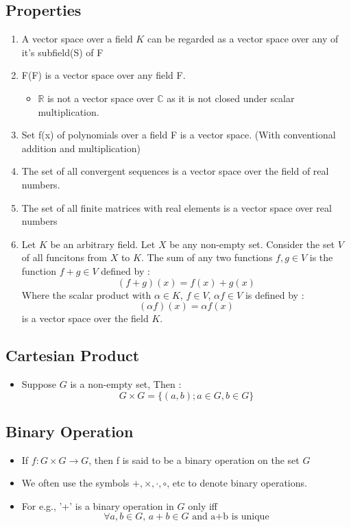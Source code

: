 \documentclass[twoside]{article}
\begin{document}
	\subsection{Properties}
	\begin{enumerate}
		\item A vector space over a field $K$ can be regarded as a vector space over any of it's subfield(S) of F
		\item F(F) is a vector space over any field F.
			\begin{itemize}
				\item $\mathbb{R}$ is not a vector space over $\mathbb{C}$ as it is not closed under scalar multiplication.
			\end{itemize}
		\item Set f(x) of polynomials over a field F is a vector space. (With conventional addition and multiplication)
		\item The set of all convergent sequences is a vector space over the field of real numbers.
		\item The set of all finite matrices with real elements is a vector space over real numbers
		\item Let $K$ be an arbitrary field. Let $X$ be any non-empty set. Consider the set $V$ of all funcitons from $X$ to $K$. The sum of any two functions $f,g \in V$ is the function $f + g \in V$ defined by : 
		\[(f+g)(x) = f(x) + g(x)\]
		Where the scalar product with $\alpha \in K$, $f \in V$, $\alpha f \in V$ is defined by :
		\[(\alpha f)(x) = \alpha f(x)\]
		is a vector space over the field $K$.
	\end{enumerate}
	
	\newpage
	
	\subsection{Cartesian Product}
	\begin{itemize}
		\item Suppose $G$ is a non-empty set, Then :
		\[G \times G = \{(a,b); a \in G, b \in G\}\]
	\end{itemize}
	
	\subsection{Binary Operation}
	\begin{itemize}
		\item If $f : G \times G \rightarrow G$, then f is said to be a binary operation on the set $G$
		\item We often use the symbols $+, \times, \cdot, \circ$, etc to denote binary operations.
		\item For e.g., '+' is a binary operation in $G$ only iff 
		\[\forall a,b \in G\text{, } a + b \in G \text{ and a+b is unique} \]
	\end{itemize}
	
\end{document}
